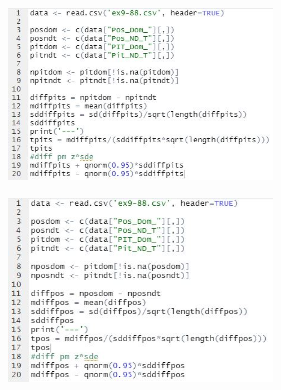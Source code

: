 \documentclass[12pt]{article}
\begin{document}
\begin{enumerate}
\begin{figure}[!h]
			\begin{subfigure}[b]{0.4\linewidth}
				\includegraphics[width=7cm]{p2.JPG}
			\end{subfigure}
			\begin{subfigure}[b]{0.4\linewidth}
				\includegraphics[width=7cm]{p2b.JPG}
			\end{subfigure}
		\end{figure}
\end{enumerate}
\newpage
\end{document}
